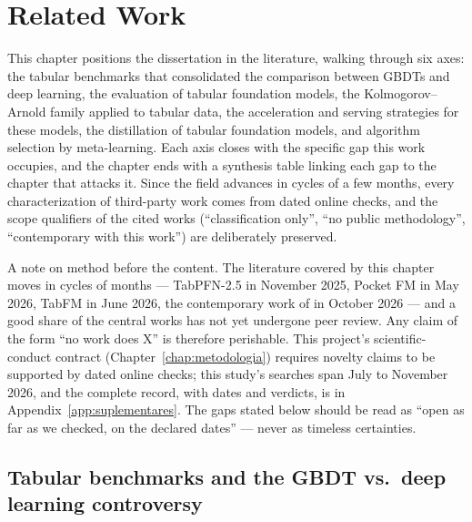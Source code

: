 \chapter{Related Work}
\label{chap:related}

This chapter positions the dissertation in the literature, walking
through six axes: the tabular benchmarks that consolidated the
comparison between GBDTs and deep learning, the evaluation of tabular
foundation models, the Kolmogorov--Arnold family applied to tabular
data, the acceleration and serving strategies for these models, the
distillation of tabular foundation models, and algorithm selection by
meta-learning. Each axis closes with the specific gap this work
occupies, and the chapter ends with a synthesis table linking each gap
to the chapter that attacks it. Since the field advances in cycles of
a few months, every characterization of third-party work comes from
dated online checks, and the scope qualifiers of the cited works
(``classification only'', ``no public methodology'', ``contemporary
with this work'') are deliberately preserved.

A note on method before the content. The literature covered by this
chapter moves in cycles of months --- TabPFN-2.5 in
November 2025, Pocket FM in May 2026, TabFM in June 2026, the
contemporary work of \citet{jeong2026} in October 2026 --- and a good
share of the central works has not yet undergone peer review. Any
claim of the form ``no work does X'' is therefore perishable. This
project's scientific-conduct contract (Chapter~\ref{chap:metodologia})
requires novelty claims to be supported by dated online checks; this
study's searches span July to November 2026, and the complete record,
with dates and verdicts, is in Appendix~\ref{app:suplementares}. The
gaps stated below should be read as ``open as far as we checked, on
the declared dates'' --- never as timeless certainties.

\section{Tabular benchmarks and the GBDT vs.\ deep learning controversy}
\label{sec:rel-benchmarks}

